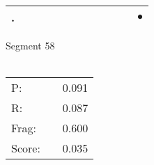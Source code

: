 \documentclass[landscape]{article}
\newcommand{\ssp}{\hspace{2pt}}
\newcommand{\mex}{\cellcolor{g}$\bullet$}
\begin{document}
\begin{tabular}{|l|p{10pt}|p{10pt}|p{10pt}|p{10pt}|p{10pt}|p{10pt}|p{10pt}|p{10pt}|p{10pt}|p{10pt}|p{10pt}|}
\hline
\ssp \cellcolor{ref10}. \ssp&\hspace{2pt}&\hspace{2pt}&\hspace{2pt}&\hspace{2pt}&\hspace{2pt}&\hspace{2pt}&\hspace{2pt}&\hspace{2pt}&\hspace{2pt}&\hspace{2pt}&\hspace{2pt}\mex\\
\hline
\end{tabular}

\vspace{6pt}
\noindent Segment 58\\\\
\noindent\begin{tabular}{lm{12pt}r}
\hline
P:&&0.091\\
R:&&0.087\\
Frag:&&0.600\\
Score:&&0.035\\
\end{tabular}

\newpage
\end{document}
